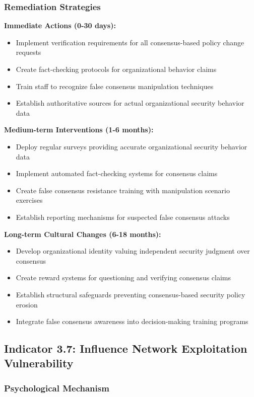 \documentclass[11pt,a4paper]{article}
\begin{document}
\subsubsection{Remediation Strategies}

\textbf{Immediate Actions (0-30 days):}
\begin{itemize}
\item Implement verification requirements for all consensus-based policy change requests
\item Create fact-checking protocols for organizational behavior claims
\item Train staff to recognize false consensus manipulation techniques
\item Establish authoritative sources for actual organizational security behavior data
\end{itemize}

\textbf{Medium-term Interventions (1-6 months):}
\begin{itemize}
\item Deploy regular surveys providing accurate organizational security behavior data
\item Implement automated fact-checking systems for consensus claims
\item Create false consensus resistance training with manipulation scenario exercises
\item Establish reporting mechanisms for suspected false consensus attacks
\end{itemize}

\textbf{Long-term Cultural Changes (6-18 months):}
\begin{itemize}
\item Develop organizational identity valuing independent security judgment over consensus
\item Create reward systems for questioning and verifying consensus claims
\item Establish structural safeguards preventing consensus-based security policy erosion
\item Integrate false consensus awareness into decision-making training programs
\end{itemize}

\subsection{Indicator 3.7: Influence Network Exploitation Vulnerability}

\subsubsection{Psychological Mechanism}
\end{document}
